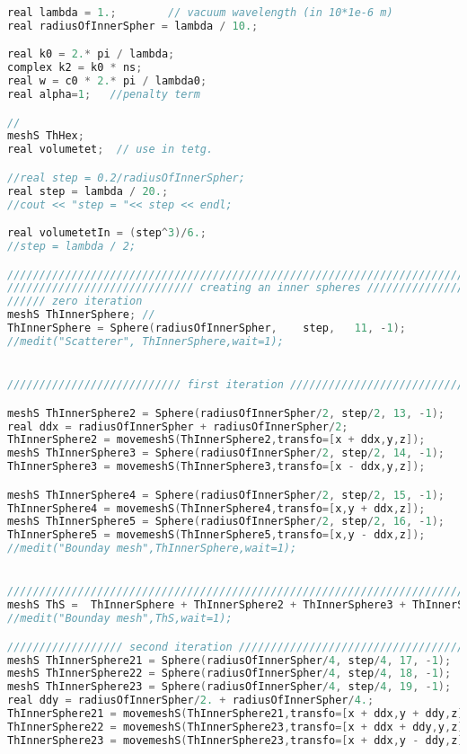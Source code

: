 \begin{lstlisting}[language=C]
real lambda = 1.;        // vacuum wavelength (in 10*1e-6 m)
real radiusOfInnerSpher = lambda / 10.;

real k0 = 2.* pi / lambda;
complex k2 = k0 * ns;
real w = c0 * 2.* pi / lambda0;
real alpha=1; 	//penalty term

// 
meshS ThHex;
real volumetet;  // use in tetg.

//real step = 0.2/radiusOfInnerSpher;
real step = lambda / 20.;
//cout << "step = "<< step << endl;

real volumetetIn = (step^3)/6.;  
//step = lambda / 2;

//////////////////////////////////////////////////////////////////////////////////////////////
///////////////////////////// creating an inner spheres ///////////////////////////////////////
////// zero iteration
meshS ThInnerSphere; //
ThInnerSphere = Sphere(radiusOfInnerSpher,    step,   11, -1);
//medit("Scatterer", ThInnerSphere,wait=1);


/////////////////////////// first iteration ///////////////////////////////////////////////////

meshS ThInnerSphere2 = Sphere(radiusOfInnerSpher/2, step/2, 13, -1);
real ddx = radiusOfInnerSpher + radiusOfInnerSpher/2;
ThInnerSphere2 = movemeshS(ThInnerSphere2,transfo=[x + ddx,y,z]);
meshS ThInnerSphere3 = Sphere(radiusOfInnerSpher/2, step/2, 14, -1);
ThInnerSphere3 = movemeshS(ThInnerSphere3,transfo=[x - ddx,y,z]);

meshS ThInnerSphere4 = Sphere(radiusOfInnerSpher/2, step/2, 15, -1);
ThInnerSphere4 = movemeshS(ThInnerSphere4,transfo=[x,y + ddx,z]);
meshS ThInnerSphere5 = Sphere(radiusOfInnerSpher/2, step/2, 16, -1);
ThInnerSphere5 = movemeshS(ThInnerSphere5,transfo=[x,y - ddx,z]);
//medit("Bounday mesh",ThInnerSphere,wait=1);


/////////////////////////////////////////////////////////////////////////////
meshS ThS =  ThInnerSphere + ThInnerSphere2 + ThInnerSphere3 + ThInnerSphere4 + ThInnerSphere5;
//medit("Bounday mesh",ThS,wait=1);

////////////////// second iteration //////////////////////////////////////////////////////////
meshS ThInnerSphere21 = Sphere(radiusOfInnerSpher/4, step/4, 17, -1);
meshS ThInnerSphere22 = Sphere(radiusOfInnerSpher/4, step/4, 18, -1);
meshS ThInnerSphere23 = Sphere(radiusOfInnerSpher/4, step/4, 19, -1);
real ddy = radiusOfInnerSpher/2. + radiusOfInnerSpher/4.;
ThInnerSphere21 = movemeshS(ThInnerSphere21,transfo=[x + ddx,y + ddy,z]);
ThInnerSphere22 = movemeshS(ThInnerSphere23,transfo=[x + ddx + ddy,y,z]);
ThInnerSphere23 = movemeshS(ThInnerSphere23,transfo=[x + ddx,y - ddy,z]);


\end{lstlisting}
